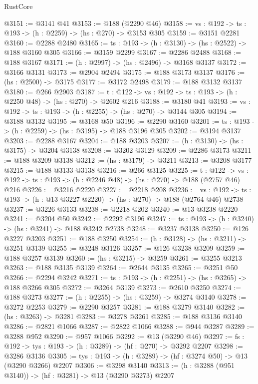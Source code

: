 \begin{lexlean}{RustCore}
\begin{coremodule}
@3151 := @3141 @41
@3153 := @188 (@2290 @46)
@3158 := {vs : @192} -> {ts : @193} -> (h : @2259) -> (hs : @270) -> @3153 @305
@3159 := @3151 @2281
@3160 := @2288 @2480
@3165 := {ts : @193} -> (h : @3130) -> (hs : @2522) -> @188 @3160 @305
@3166 := @3159 @2299
@3167 := @2286 @2488
@3168 := @188 @3167
@3171 := (h : @2997) -> (hs : @2496) -> @3168 @3137
@3172 := @3166 @3131
@3173 := @2904 @2494
@3175 := @188 @3173 @3137
@3176 := (hs : @2500) -> @3175
@3177 := @3172 @2498
@3179 := @188 @3132 @3137
@3180 := @266 @2903
@3187 := {t : @122} -> {vs : @192} -> {ts : @193} -> (h : @2250 @48) -> (hs : @270) -> @2602 @216
@3188 := @3180 @41
@3193 := {vs : @192} -> {ts : @193} -> (h : @2255) -> (hs : @270) -> @3144 @305
@3194 := @3188 @3132
@3195 := @3168 @50
@3196 := @2290 @3160
@3201 := {ts : @193} -> (h : @2259) -> (hs : @3195) -> @188 @3196 @305
@3202 := @3194 @3137
@3203 := @2288 @3167
@3204 := @188 @3203
@3207 := (h : @3130) -> (hs : @3175) -> @3204 @3138
@3208 := @3202 @3129
@3209 := @2286 @3173
@3211 := @188 @3209 @3138
@3212 := (hs : @3179) -> @3211
@3213 := @3208 @3177
@3215 := @188 @3133 @3138
@3216 := @266 @3125
@3225 := {t : @122} ->
  {vs : @192} -> {ts : @193} -> (h : @2246 @48) -> (hs : @270) -> @188 (@2757 @46) @216
@3226 := @3216 @2220
@3227 := @2218 @208
@3236 := {vs : @192} ->
  {ts : @193} -> (h : @13 @3227 @2220) -> (hs : @270) -> @188 (@2764 @46) @2738
@3237 := @3226 @3133
@3238 := @2218 @202
@3240 := @13 @3238 @2220
@3241 := @3204 @50
@3242 := @2292 @3196
@3247 := {ts : @193} -> (h : @3240) -> (hs : @3241) -> @188 @3242 @2738
@3248 := @3237 @3138
@3250 := @126 @3227 @3203
@3251 := @188 @3250
@3254 := (h : @3128) -> (hs : @3211) -> @3251 @3139
@3255 := @3248 @3126
@3257 := @126 @3238 @3209
@3259 := @188 @3257 @3139
@3260 := (hs : @3215) -> @3259
@3261 := @3255 @3213
@3263 := @188 @3135 @3139
@3264 := @2644 @3135
@3265 := @3251 @50
@3266 := @2294 @3242
@3271 := {ts : @193} -> (h : @2251) -> (hs : @3265) -> @188 @3266 @305
@3272 := @3264 @3139
@3273 := @2610 @3250
@3274 := @188 @3273
@3277 := (h : @2255) -> (hs : @3259) -> @3274 @3140
@3278 := @3272 @2253
@3279 := @2290 @3257
@3281 := @188 @3279 @3140
@3282 := (hs : @3263) -> @3281
@3283 := @3278 @3261
@3285 := @188 @3136 @3140
@3286 := @2821 @1066
@3287 := @2822 @1066
@3288 := @944 @3287
@3289 := @3288 @952
@3290 := @957 @1066
@3292 := @13 (@3290 @46)
@3297 := {fs : @192} -> {tys : @193} -> (h : @3289) -> (hf : @270) -> @3292 @2207
@3298 := @3286 @3136
@3305 := {tys : @193} -> (h : @3289) -> (hf : @3274 @50) -> @13 (@3290 @3266) @2207
@3306 := @3298 @3140
@3313 := (h : @3288 (@951 @3140)) -> (hf : @3281) -> @13 (@3290 @3273) @2207

\end{coremodule}
\end{lexlean}
